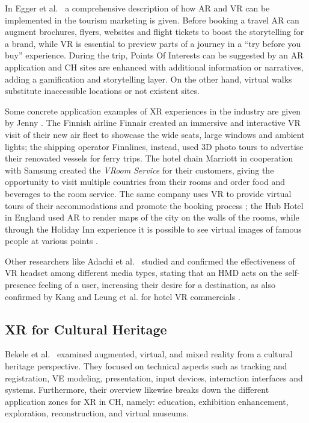 In Egger et al.~\cite{egger_augmented_2020} a comprehensive description of how AR and VR can be implemented in the tourism marketing is given. Before booking a travel AR can augment brochures, flyers, websites and flight tickets to boost the storytelling for a brand, while VR is essential to preview parts of a journey in a “try before you buy” experience. During the trip, Points Of Interests can be suggested by an AR application and CH sites are enhanced with additional information or narratives, adding a gamification and storytelling layer. On the other hand, virtual walks substitute inaccessible locations or not existent sites.

Some concrete application examples of XR experiences in the industry are given by Jenny \cite{jenny_enhancing_2017}. The Finnish airline Finnair created an immersive and interactive VR visit of their new air fleet to showcase the wide seats, large windows and ambient lights; the shipping operator Finnlines, instead, used 3D photo tours to advertise their renovated vessels for ferry trips. The hotel chain Marriott in cooperation with Samsung created the \textit{VRoom Service} for their customers, giving the opportunity to visit multiple countries from their rooms and order food and beverages to the room service. The same company uses VR to provide virtual tours of their accommodations and promote the booking process \cite{adachi_using_2020}; the Hub Hotel in England used AR to render maps of the city on the walls of the rooms, while through the Holiday Inn experience it is possible to see virtual images of famous people at various points \cite{ercan_examination_2020}.

Other researchers like Adachi et al.~\cite{adachi_using_2020} studied and confirmed the effectiveness of VR headset among different media types, stating that an \gls{HMD} acts on the self-presence feeling of a user, increasing their desire for a destination, as also confirmed by Kang \cite{kang_impact_2020} and Leung et al. for hotel VR commercials \cite{leung_fad_2020}.

\subsection{XR for Cultural Heritage}

Bekele et al.~\cite{bekele_survey_2018} examined augmented, virtual, and mixed reality from a cultural heritage perspective. They focused on technical aspects such as tracking and registration, VE modeling, presentation, input devices, interaction interfaces and systems. Furthermore, their overview likewise breaks down the different application zones for XR in CH, namely: education, exhibition enhancement, exploration, reconstruction, and virtual museums.

